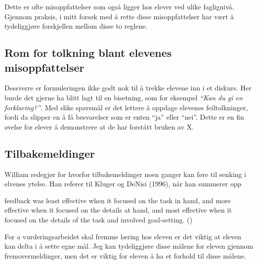 \documentclass[main.tex]{subfiles}
\begin{document}
Dette er ofte misoppfattelser som også ligger hos elever ved ulike faglignivå. Gjennom praksis, i mitt forsøk med å 
rette disse misoppfattelser har vært å tydeliggjøre forskjellen mellom disse to reglene. 

\subsection*{Rom for tolkning blant elevenes misoppfattelser}

Dessverre er formuleringen ikke
godt nok til å trekke elevene inn i et diskurs. Her burde det gjerne ha blitt lagt til en bisetning, som 
for eksempel \emph{``Kan du gi en forklaring?''}. Med slike spørsmål er det lettere å oppdage elevenes
feiltolkninger, fordi da slipper en å få besvarelser som er enten ``ja'' eller ``nei''. 
Dette er en fin øvelse for elever å demonstrere at de har forstått bruken av X.


\subsection*{Tilbakemeldinger}

William redegjør for hvorfor tilbakemeldinger noen ganger kan føre til senking 
i elvenes ytelse. Han referer til Kluger og DeNisi (1996), når han summerer opp 
\begin{displayquote}
\textelp{} feedback was least effective when it focused on the task in hand, 
and more effective when it focused on the details at hand, and most effective 
when it focused on the details of the task and involved goal-setting.
()
\end{displayquote}
For a vurderingsarbeidet
skal fremme læring hos eleven er det viktig at eleven kan delta i å sette egne
mål. Jeg kan tydeliggjøre disse målene for eleven gjennom fremovermeldinger,
men det er viktig for eleven å ha et forhold til disse målene.
\end{document}
